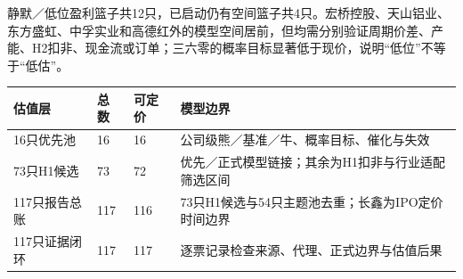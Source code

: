 静默／低位盈利篮子共12只，已启动仍有空间篮子共4只。宏桥控股、天山铝业、东方盛虹、中孚实业和高德红外的模型空间居前，但均需分别验证周期价差、产能、H2扣非、现金流或订单；三六零的概率目标显著低于现价，说明“低位”不等于“低估”。

\begin{exhibitbox}
\begin{tabularx}{\textwidth}{L{3.2cm}R{1.5cm}R{1.5cm}X}
\toprule
\textbf{估值层} & \textbf{总数} & \textbf{可定价} & \textbf{模型边界} \\
\midrule
16只优先池 & 16 & 16 & 公司级熊／基准／牛、概率目标、催化与失效 \\
73只H1候选 & 73 & 72 & 优先／正式模型链接；其余为H1扣非与行业适配筛选区间 \\
117只报告总账 & 117 & 116 & 73只H1候选与54只主题池去重；长鑫为IPO定价时间边界 \\
117只证据闭环 & 117 & 117 & 逐票记录检查来源、代理、正式边界与估值后果 \\
\bottomrule
\end{tabularx}
\end{exhibitbox}
